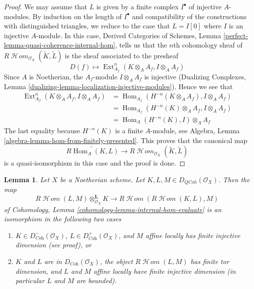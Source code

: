 \documentclass{stacks-project}
\theoremstyle{plain}
\newtheorem{lemma}[subsection]{Lemma}
\theoremstyle{definition}
\theoremstyle{remark}
\numberwithin{equation}{subsection}
\def\Hom{\mathop{\mathrm{Hom}}\nolimits}
\def\Ext{\mathop{\mathrm{Ext}}\nolimits}
\def\SheafHom{\mathop{\mathcal{H}\!\mathit{om}}\nolimits}
\def\QCoh{\mathit{QCoh}}
\begin{document}
\begin{proof}
We may assume that $L$ is given by a finite complex $I^\bullet$
of injective $A$-modules. By induction on the length of $I^\bullet$
and compatibility of the constructions with distinguished triangles,
we reduce to the case that $L = I[0]$ where $I$ is an injective $A$-module.
In this case, Derived Categories of Schemes, Lemma
\ref{perfect-lemma-quasi-coherence-internal-hom}, tells us that
the $n$th cohomology sheaf of
$R\SheafHom_{\mathcal{O}_X}(\widetilde{K}, \widetilde{L})$
is the sheaf associated to the presheaf
$$
D(f) \longmapsto \Ext^n_{A_f}(K \otimes_A A_f, I \otimes_A A_f)
$$
Since $A$ is Noetherian, the $A_f$-module $I \otimes_A A_f$ is injective
(Dualizing Complexes, Lemma
\ref{dualizing-lemma-localization-injective-modules}). Hence we see that
\begin{align*}
\Ext^n_{A_f}(K \otimes_A A_f, I \otimes_A A_f)
& =
\Hom_{A_f}(H^{-n}(K \otimes_A A_f), I \otimes_A A_f) \\
& =
\Hom_{A_f}(H^{-n}(K) \otimes_A A_f, I \otimes_A A_f) \\
& =
\Hom_A(H^{-n}(K), I) \otimes_A A_f
\end{align*}
The last equality because $H^{-n}(K)$ is a finite $A$-module, see
Algebra, Lemma \ref{algebra-lemma-hom-from-finitely-presented}.
This proves that the canonical map
$$
\widetilde{R\Hom_A(K, L)}
\longrightarrow
R\SheafHom_{\mathcal{O}_X}(\widetilde{K}, \widetilde{L})
$$
is a quasi-isomorphism in this case and the proof is done.
\end{proof}

\begin{lemma}
\label{lemma-internal-hom-evaluate-isom}
Let $X$ be a Noetherian scheme. Let $K, L, M \in D_\QCoh(\mathcal{O}_X)$. 
Then the map
$$
R\SheafHom(L, M) \otimes_{\mathcal{O}_X}^\mathbf{L} K
\longrightarrow
R\SheafHom(R\SheafHom(K, L), M)
$$
of Cohomology, Lemma \ref{cohomology-lemma-internal-hom-evaluate}
is an isomorphism in the following two cases
\begin{enumerate}
\item $K \in D^-_{\textit{Coh}}(\mathcal{O}_X)$,
$L \in D^+_{\textit{Coh}}(\mathcal{O}_X)$, and $M$ affine locally has
finite injective dimension (see proof), or
\item $K$ and $L$ are in $D_{\textit{Coh}}(\mathcal{O}_X)$,
the object $R\SheafHom(L, M)$ has finite tor dimension, and
$L$ and $M$ affine locally have finite injective dimension
(in particular $L$ and $M$ are bounded).
\end{enumerate}
\end{lemma}
\end{document}
